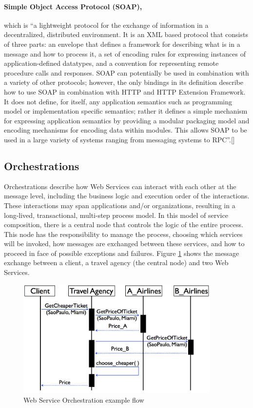 \paragraph{Simple Object Access Protocol (SOAP),}
which is ``a lightweight protocol for the exchange of information in a decentralized, distributed environment. It is an XML based protocol that consists of three parts: an envelope that defines a framework for describing what is in a message and how to process it, a set of encoding rules for expressing instances of application-defined datatypes, and a convention for representing remote procedure calls and responses. SOAP can potentially be used in combination with a variety of other protocols; however, the only bindings in its definition describe how to use SOAP in combination with HTTP and HTTP Extension Framework. It does not define, for itself, any application semantics such as programming model or implementation specific semantics; rather it defines a simple mechanism for expressing application semantics by providing a modular packaging model and encoding mechanisms for encoding data within modules. This allows SOAP to be used in a large variety of systems ranging from messaging systems to RPC''.[\citet{SOAP}]

\subsection{Orchestrations}
Orchestrations describe how Web Services can interact with each other at the message level, including the business logic and execution order of the interactions. These interactions may span applications and/or organizations, resulting in a long-lived, transactional, multi-step process model. In this model of service composition, there is a central node that controls the logic of the entire process. This node has the responsibility to manage the process, choosing which services will be invoked, how messages are exchanged between these services, and how to proceed in face of possible exceptions and failures. Figure \ref{BPELexample} shows the message exchange between a client, a travel agency (the central node) and two Web Services.

\begin{figure}[h]
  \centering
  \includegraphics[width=0.9\textwidth]{images/BPELexample}
  \caption{Web Service Orchestration example flow}
  \label{BPELexample}
\end{figure}

